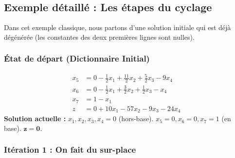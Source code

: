 \documentclass[12pt,a4paper]{article}
\begin{document}
\subsection{Exemple détaillé : Les étapes du cyclage}

Dans cet exemple classique, nous partons d'une solution initiale qui est déjà dégénérée (les constantes des deux premières lignes sont nulles).

\subsubsection*{État de départ (Dictionnaire Initial)}
\begin{align*}
x_5 &= 0 - \frac{1}{2}x_1 + \frac{11}{2}x_2 + \frac{5}{2}x_3 - 9x_4\\
x_6 &= 0 - \frac{1}{2}x_1 + \frac{3}{2}x_2 + \frac{1}{2}x_3 - x_4\\
x_7 &= 1 - x_1\\
z &= 0 + 10x_1 - 57x_2 - 9x_3 - 24x_4
\end{align*}
\textbf{Solution actuelle :} $x_1, x_2, x_3, x_4 = 0$ (hors-base). $x_5=0, x_6=0, x_7=1$ (en base). $\mathbf{z = 0}$.

\hrulefill

\subsubsection*{Itération 1 : On fait du sur-place}
\end{document}
